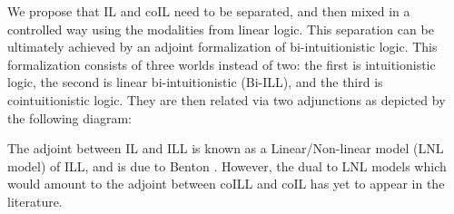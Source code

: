 We propose that IL and coIL need to be separated, and then mixed in a
controlled way using the modalities from linear logic.  This
separation can be ultimately achieved by an adjoint formalization of
bi-intuitionistic logic.  This formalization consists of three worlds
instead of two: the first is intuitionistic logic, the second is
linear bi-intuitionistic (Bi-ILL), and the third is cointuitionistic
logic.  They are then related via two adjunctions as depicted by the
following diagram:
\begin{center}
    
\end{center}
The adjoint between IL and ILL is known as a Linear/Non-linear model
(LNL model) of ILL, and is due to Benton \cite{Benton:1994}.  However,
the dual to LNL models which would amount to the adjoint between coILL
and coIL has yet to appear in the literature.

